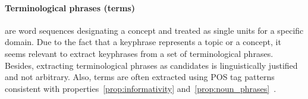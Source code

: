   \paragraph{Terminological phrases (terms)} are word sequences designating a
  concept and treated as single units for a specific domain. Due to the fact
  that a keyphrase represents a topic or a concept, it seems relevant to extract
  keyphrases from  a set of terminological phrases. Besides, extracting
  terminological phrases as candidates is linguistically justified and not
  arbitrary. Also, terms are often extracted using POS tag
  patterns consistent with properties~\ref{prop:informativity}
  and~\ref{prop:noun_phrases}~\cite{castellvi2001automatictermdetection}.


